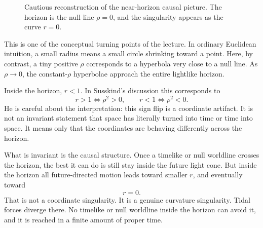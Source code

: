 \begin{figure}[htbp]
\centering
{}
\caption{Cautious reconstruction of the near-horizon causal picture. The horizon is the null line \(\rho=0\), and the singularity appears as the curve \(r=0\).}
\end{figure}

This is one of the conceptual turning points of the lecture. In ordinary Euclidean intuition, a small radius means a small circle shrinking toward a point. Here, by contrast, a tiny positive \(\rho\) corresponds to a hyperbola very close to a null line. As \(\rho\to 0\), the constant-\(\rho\) hyperbolae approach the entire lightlike horizon.

Inside the horizon, \(r<1\). In Susskind's discussion this corresponds to
\begin{equation}
r>1 \Longleftrightarrow \rho^2>0,
\qquad
r<1 \Longleftrightarrow \rho^2<0.
\end{equation}
He is careful about the interpretation: this sign flip is a coordinate artifact. It is not an invariant statement that space has literally turned into time or time into space. It means only that the coordinates are behaving differently across the horizon.

What is invariant is the causal structure. Once a timelike or null worldline crosses the horizon, the best it can do is still stay inside the future light cone. But inside the horizon all future-directed motion leads toward smaller \(r\), and eventually toward
\begin{equation}
r=0.
\end{equation}
That is not a coordinate singularity. It is a genuine curvature singularity. Tidal forces diverge there. No timelike or null worldline inside the horizon can avoid it, and it is reached in a finite amount of proper time.

